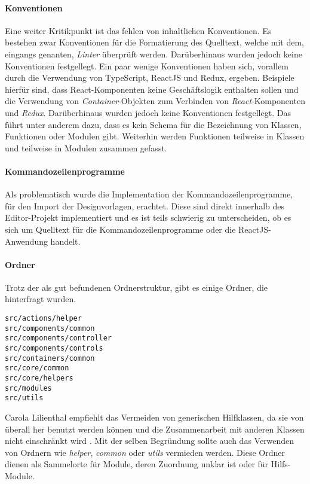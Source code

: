 \paragraph{Konventionen}
Eine weiter Kritikpunkt ist das fehlen von inhaltlichen Konventionen. Es bestehen zwar Konventionen für die Formatierung des Quelltext, welche mit dem, eingangs genanten, \emph{Linter} überprüft werden. Darüberhinaus wurden jedoch keine Konventionen festgellegt. 
Ein paar wenige Konventionen haben sich, vorallem durch die Verwendung von TypeScript, ReactJS und Redux, ergeben. Beispiele hierfür sind, dass React-Komponenten keine Geschäftslogik enthalten sollen und die Verwendung von \emph{Container}-Objekten zum Verbinden von \emph{React}-Komponenten und \emph{Redux}.
Darüberhinaus wurden jedoch keine Konventionen festgellegt.
Das führt unter anderem dazu, dass es kein Schema für die Bezeichnung von Klassen, Funktionen oder Modulen gibt. Weiterhin werden Funktionen teilweise in Klassen und teilweise in Modulen zusammen gefasst. 

\paragraph{Kommandozeilenprogramme} 
Als problematisch wurde die Implementation der Kommandozeilenprogramme, für den Import der Designvorlagen, erachtet. Diese sind direkt innerhalb des Editor-Projekt implementiert und es ist teils schwierig zu unterscheiden, ob es sich um Quelltext für die Kommandozeilenprogramme oder die ReactJS-Anwendung handelt. 

\paragraph{Ordner} Trotz der als gut befundenen Ordnerstruktur, gibt es einige Ordner, die hinterfragt wurden.
\lstset{language=sh}
\begin{lstlisting}
src/actions/helper
src/components/common
src/components/controller
src/components/controls
src/containers/common
src/core/common
src/core/helpers
src/modules
src/utils
\end{lstlisting}

Carola Lilienthal empfiehlt das Vermeiden von generischen Hilfklassen, da sie von überall her benutzt werden können und die Zusammenarbeit mit anderen Klassen nicht einschränkt wird \autocite[vgl.][159]{Lilienthal2019}.    
Mit der selben Begründung sollte auch das Verwenden von Ordnern wie \emph{helper}, \emph{common} oder \emph{utils} vermieden werden. Diese Ordner dienen als Sammelorte für Module, deren Zuordnung unklar ist oder für Hilfs-Module. 

